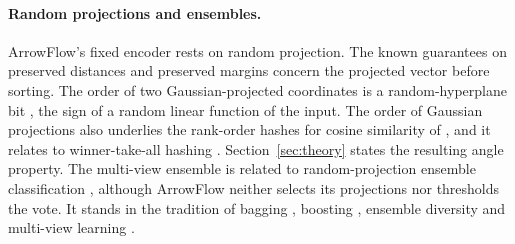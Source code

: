 \paragraph{Random projections and ensembles.}
ArrowFlow's fixed encoder rests on random projection. The known guarantees on preserved distances \citep{johnson1984extensions,achlioptas2003database} and preserved margins \citep{arriaga2006algorithmic} concern the projected vector before sorting. The order of two Gaussian-projected coordinates is a random-hyperplane bit \citep{charikar2002similarity}, the sign of a random linear function of the input. The order of Gaussian projections also underlies the rank-order hashes for cosine similarity of \citet{eshghi2008locality}, and it relates to winner-take-all hashing \citep{yagnik2011power}. Section~\ref{sec:theory} states the resulting angle property. The multi-view ensemble is related to random-projection ensemble classification \citep{cannings2017random}, although ArrowFlow neither selects its projections nor thresholds the vote. It stands in the tradition of bagging \citep{breiman1996bagging}, boosting \citep{schapire1990strength}, ensemble diversity \citep{dietterich2000ensemble,kuncheva2003diversity} and multi-view learning \citep{xu2013survey}.

